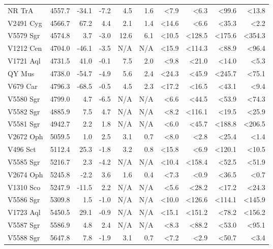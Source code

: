 \documentclass{aa}
\begin{document}
\begin{longtable}{lrrrrrrrrr}
	NR TrA &  4557.7 &  -34.1 &  -7.2 &   4.5 &       1.6 &   <7.9 &    <6.3 &    <99.6 &   <13.8 \\
	V2491 Cyg &  4566.7 &   67.2 &   4.4 &   2.1 &       1.4 &  <14.6 &    <6.6 &    <35.3 &    <2.2 \\
	V5579 Sgr &  4574.8 &    3.7 &  -3.0 &  12.6 &       6.1 &  <10.5 &  <128.5 &   <175.6 &  <354.3 \\
	V1212 Cen &  4704.0 &  -46.1 &  -3.5 &   N/A &       N/A &  <15.9 &  <114.3 &    <88.9 &   <96.4 \\
	V1721 Aql &  4731.5 &   41.0 &  -0.1 &   7.5 &       2.0 &   <9.8 &   <21.0 &    <14.0 &    <5.3 \\
	QY Mus &  4738.0 &  -54.7 &  -4.9 &   5.6 &       2.4 &  <24.3 &   <45.9 &   <245.7 &   <75.1 \\
	V679 Car &  4796.3 &  -68.5 &  -0.5 &   4.5 &       2.3 &  <17.2 &   <16.5 &    <43.1 &    <9.4 \\
	V5580 Sgr &  4799.0 &    4.7 &  -6.5 &   N/A &       N/A &   <6.6 &   <44.5 &    <53.9 &   <74.3 \\
	V5582 Sgr &  4885.9 &    7.5 &   4.7 &   N/A &       N/A &   <8.2 &  <116.1 &    <19.5 &   <25.9 \\
	V5581 Sgr &  4942.7 &    2.2 &   1.8 &   N/A &       N/A &   <6.0 &   <45.7 &   <188.8 &  <206.5 \\
	V2672 Oph &  5059.5 &    1.0 &   2.5 &   3.1 &       0.7 &   <8.0 &    <2.8 &    <25.4 &    <1.4 \\
	V496 Sct &  5112.4 &   25.3 &  -1.8 &   3.2 &       0.8 &  <15.8 &    <6.9 &   <120.1 &   <10.5 \\
	V5585 Sgr &  5216.7 &    2.3 &  -4.2 &   N/A &       N/A &  <10.4 &  <158.4 &    <52.5 &   <51.9 \\
	V2674 Oph &  5245.8 &   -2.2 &   3.6 &   1.6 &       0.4 &   <7.3 &    <0.9 &    <36.5 &    <0.7 \\
	V1310 Sco &  5247.9 &  -11.5 &   2.2 &   N/A &       N/A &   <5.6 &   <28.2 &    <17.2 &   <24.3 \\
	V5586 Sgr &  5309.8 &    1.5 &  -1.0 &   N/A &       N/A &  <10.0 &  <126.6 &   <114.1 &  <145.9 \\
	V1723 Aql  &  5450.5 &   29.1 &  -0.9 &   N/A &       N/A &  <15.1 &  <151.2 &    <78.2 &  <156.2 \\
	V5587 Sgr &  5586.9 &    4.8 &   2.4 &   N/A &       N/A &   <8.3 &   <88.2 &    <53.0 &   <95.1 \\
	V5588 Sgr &  5647.8 &    7.8 &  -1.9 &   3.1 &       0.7 &   <7.2 &    <2.9 &    <50.7 &    <3.4 \\

\end{longtable}
\end{document}
